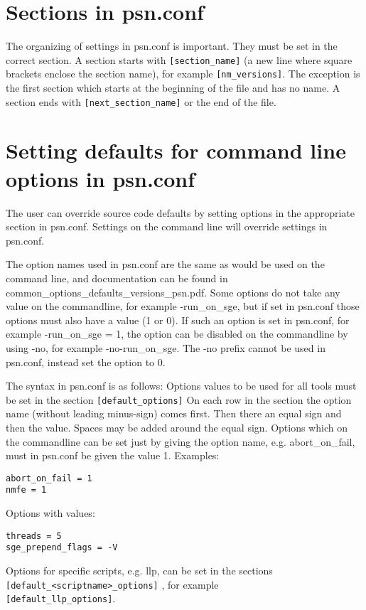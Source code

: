 \section{Sections in psn.conf}
The organizing of settings in psn.conf is important. They must be set in the correct section. A section starts with
\verb|[section_name]| 
(a new line where square brackets enclose the section name), for example
\verb|[nm_versions]|.
The exception is the first section which starts at the beginning of the file and has no name.
A section ends with 
\verb|[next_section_name]|
or the end of the file.

\section{Setting defaults for command line options in psn.conf}
The user can override source code defaults by setting options in the appropriate section in psn.conf. Settings on the command line will override settings in psn.conf. 

The option names used in psn.conf are the same as would be used on the command line, and documentation can be found in common\_options\_defaults\_versions\_psn.pdf. Some options do not take any value on the commandline, for example -run\_on\_sge, but if set in psn.conf those options must also have a value (1 or 0). If such an option is set in psn.conf, for example
-run\_on\_sge = 1, the option can be disabled on the commandline by using -no, for example 
-no-run\_on\_sge. The -no prefix cannot be used in psn.conf, instead set the option to 0.

The syntax in psn.conf is as follows: Options values to be used for all tools must be set in the section \verb|[default_options]| 
On each row in the section the option name (without leading minus-sign) comes first. Then there an equal sign and then the value. Spaces may be added around the equal sign. Options which on the commandline can be set just by giving the option name, e.g. abort\_on\_fail, must in psn.conf be given the value 1. Examples:
\begin{verbatim}
abort_on_fail = 1
nmfe = 1
\end{verbatim}
Options with values:
\begin{verbatim}
threads = 5
sge_prepend_flags = -V 
\end{verbatim}
Options for specific scripts, e.g. llp, can be set in the sections\\
\verb|[default_<scriptname>_options]| , for example\\
 \verb|[default_llp_options]|.

